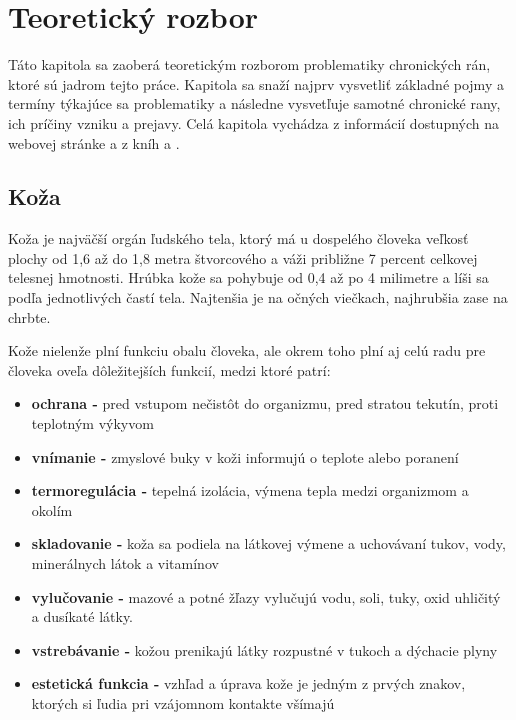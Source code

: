 \chapter{Teoretický rozbor}
\label{chap:teoreticky-rozbor}
Táto kapitola sa zaoberá teoretickým rozborom problematiky chronických rán, ktoré sú jadrom tejto práce. Kapitola sa snaží najprv vysvetliť základné pojmy a termíny týkajúce sa problematiky a následne vysvetľuje samotné chronické rany, ich príčiny vzniku a prejavy. Celá kapitola vychádza z informácií dostupných na webovej stránke \cite{pcCdSrbbhhlr5YcQ} a z kníh \cite{Hlinkova2015} a \cite{Pokorna2012}.  

\section{Koža}
Koža je najväčší orgán ľudského tela, ktorý má u dospelého človeka veľkosť plochy od 1,6 až do 1,8 metra štvorcového a váži približne 7 percent celkovej telesnej hmotnosti. Hrúbka kože sa pohybuje od 0,4 až po 4 milimetre a líši sa podľa jednotlivých častí tela. Najtenšia je na očných viečkach, najhrubšia zase na chrbte.

Kože nielenže plní funkciu obalu človeka, ale okrem toho plní aj celú radu pre človeka oveľa dôležitejších funkcií, medzi ktoré patrí:
\begin{itemize}  
\item \textbf{ochrana -} pred vstupom nečistôt do organizmu, pred stratou tekutín, proti teplotným výkyvom
\item \textbf{vnímanie -} zmyslové buky v koži informujú o teplote alebo poranení
\item \textbf{termoregulácia -} tepelná izolácia, výmena tepla medzi organizmom a okolím
\item \textbf{skladovanie -} koža sa podiela na látkovej výmene a uchovávaní tukov, vody, minerálnych látok a vitamínov
\item \textbf{vylučovanie -} mazové a potné žľazy vylučujú vodu, soli, tuky, oxid uhličitý a dusíkaté látky.
\item \textbf{vstrebávanie -} kožou prenikajú látky rozpustné v tukoch a dýchacie plyny
\item \textbf{estetická funkcia -} vzhľad a úprava kože je jedným z prvých znakov, ktorých si ľudia pri vzájomnom kontakte všímajú
\end{itemize}

